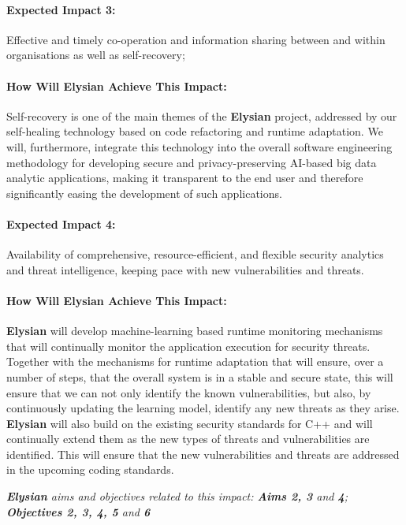 \documentclass[a4paper,11pt]{article}
\newcommand{\project}[1]{\textbf{#1}\xspace}
\newcommand{\SECURITY}{\project{Elysian}}
\newcommand{\TheProject}{\SECURITY}
\begin{document}
\begin{mdframed}[backgroundcolor=blue!5]
\paragraph{Expected Impact 3:}
Effective and timely co-operation and information sharing between and within organisations as well as self-recovery;
\end{mdframed}

\begin{mdframed}[backgroundcolor=gray!10]
\paragraph{How Will \TheProject{} Achieve This Impact:}
Self-recovery is one of the main themes of the \TheProject{} project, addressed by our self-healing technology based on code refactoring and runtime adaptation. We will, furthermore, integrate this technology into the overall software engineering methodology for developing secure and privacy-preserving AI-based big data analytic applications, making it transparent to the end user and therefore significantly easing the development of such applications. 
\end{mdframed}

\begin{mdframed}[backgroundcolor=blue!5]
\paragraph{Expected Impact 4:}
Availability of comprehensive, resource-efficient, and flexible security analytics and threat intelligence, keeping pace with new vulnerabilities and threats.
\end{mdframed}

\begin{mdframed}[backgroundcolor=gray!10]
\paragraph{How Will \TheProject{} Achieve This Impact:}
\TheProject{} will develop machine-learning based runtime monitoring mechanisms that will continually monitor the application execution for security threats. Together with the mechanisms for runtime adaptation that will ensure, over a number of steps, that the overall system is in a stable and secure state, this will ensure that we can not only identify the known vulnerabilities, but also, by continuously updating the learning model, identify any new threats as they arise. \TheProject{} will also build on the existing security standards for C++ and will continually extend them as the new types of threats and vulnerabilities are identified. This will ensure that the new vulnerabilities and threats are addressed in the upcoming coding standards. 

\emph{\TheProject{} aims and objectives related to this impact: \textbf{Aims 2, 3}  and \textbf{4}; \textbf{Objectives 2, 3, 4, 5} and \textbf{6} }


\end{mdframed}
\end{document}

